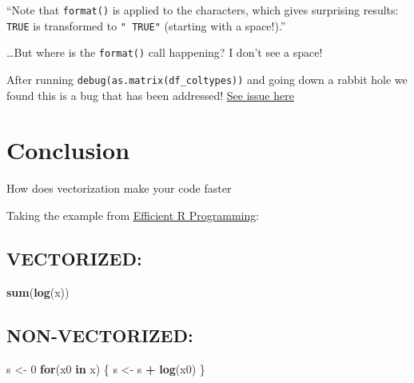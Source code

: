 \documentclass[]{book}
\newenvironment{Shaded}{\begin{snugshade}}{\end{snugshade}}
\newcommand{\ControlFlowTok}[1]{\textcolor[rgb]{0.13,0.29,0.53}{\textbf{#1}}}
\newcommand{\DecValTok}[1]{\textcolor[rgb]{0.00,0.00,0.81}{#1}}
\newcommand{\KeywordTok}[1]{\textcolor[rgb]{0.13,0.29,0.53}{\textbf{#1}}}
\newcommand{\NormalTok}[1]{#1}
\newcommand{\OperatorTok}[1]{\textcolor[rgb]{0.81,0.36,0.00}{\textbf{#1}}}
\newcommand{\StringTok}[1]{\textcolor[rgb]{0.31,0.60,0.02}{#1}}
\begin{document}
``Note that \texttt{format()} is applied to the characters, which gives surprising results: \texttt{TRUE} is transformed to \texttt{"\ TRUE"} (starting with a space!).''

\ldots{}But where is the \texttt{format()} call happening? I don't see a space!

After running \texttt{debug(as.matrix(df\_coltypes))} and going down a rabbit hole we found this is a bug that has been addressed! \href{https://github.com/Tazinho/Advanced-R-Solutions/issues/213}{See issue here}

\hypertarget{conclusion}{%
\section*{Conclusion}\label{conclusion}}

How does vectorization make your code faster

Taking the example from \href{https://csgillespie.github.io/efficientR/programming.html\#vectorised-code}{Efficient R Programming}:

\hypertarget{vectorized}{%
\subsection*{VECTORIZED:}\label{vectorized}}

\begin{Shaded}
\begin{Highlighting}[]
\KeywordTok{sum}\NormalTok{(}\KeywordTok{log}\NormalTok{(x))}
\end{Highlighting}
\end{Shaded}

\hypertarget{non-vectorized}{%
\subsection*{NON-VECTORIZED:}\label{non-vectorized}}

\begin{Shaded}
\begin{Highlighting}[]
\NormalTok{s <-}\StringTok{ }\DecValTok{0}
\ControlFlowTok{for}\NormalTok{(x0 }\ControlFlowTok{in}\NormalTok{ x) \{}
\NormalTok{  s <-}\StringTok{ }\NormalTok{s }\OperatorTok{+}\StringTok{ }\KeywordTok{log}\NormalTok{(x0)}
\NormalTok{\}}
\end{Highlighting}
\end{Shaded}
\end{document}
